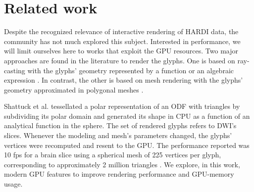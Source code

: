 \documentclass[twoside,twocolumn,10pt]{article}
\begin{document}

\section{Related work}
\label{sec::related_work}



 Despite the recognized relevance of interactive rendering of HARDI data, the community has not much explored this subject. Interested in performance, we will limit ourselves here to works that exploit the GPU resources. Two major approaches are found in the literature to render the glyphs. One is based on ray-casting with the glyphs' geometry represented by a function or an algebraic expression \cite{peeters2009, almsick2011}. In contrast, the other is based on mesh rendering with the glyphs' geometry approximated in polygonal meshes \cite{shattuck2008}.
 
 

Shattuck et al. \cite{shattuck2008} tessellated a polar representation of an ODF with triangles by subdividing its polar domain and generated its shape in CPU as a function of an analytical function in the sphere. The set of rendered glyphs refers to DWI's slices. Whenever the modeling and mesh's parameters changed, the glyphs' vertices were recomputed and resent to the GPU. The performance reported was 10 fps for a brain slice using a spherical mesh of 225 vertices per glyph, corresponding to approximately 2 million triangles . We explore, in this work, modern GPU features to improve rendering performance and GPU-memory usage. %
\end{document}
